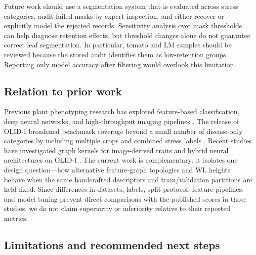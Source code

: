 \documentclass[conference]{IEEEtran}
\begin{document}
Future work should use a segmentation system that is evaluated across stress categories, audit failed masks by expert inspection, and either recover or explicitly model the rejected records. Sensitivity analysis over mask thresholds can help diagnose retention effects, but threshold changes alone do not guarantee correct leaf segmentation. In particular, tomato and LM samples should be reviewed because the stored audit identifies them as low-retention groups. Reporting only model accuracy after filtering would overlook this limitation.

\subsection{Relation to prior work}

Previous plant phenotyping research has explored feature-based classification, deep neural networks, and high-throughput imaging pipelines \cite{Mohanty2016,Gill2022,Pacal2024}. The release of OLID-I broadened benchmark coverage beyond a small number of disease-only categories by including multiple crops and combined stress labels \cite{Orka2023}. Recent studies have investigated graph kernels for image-derived traits and hybrid neural architectures on OLID-I \cite{Sriram2026,Karthikeyan2026}. The current work is complementary: it isolates one design question---how alternative feature-graph topologies and WL heights behave when the same handcrafted descriptors and train/validation partitions are held fixed. Since differences in datasets, labels, split protocol, feature pipelines, and model tuning prevent direct comparisons with the published scores in those studies, we do not claim superiority or inferiority relative to their reported metrics.

\subsection{Limitations and recommended next steps}
\end{document}

